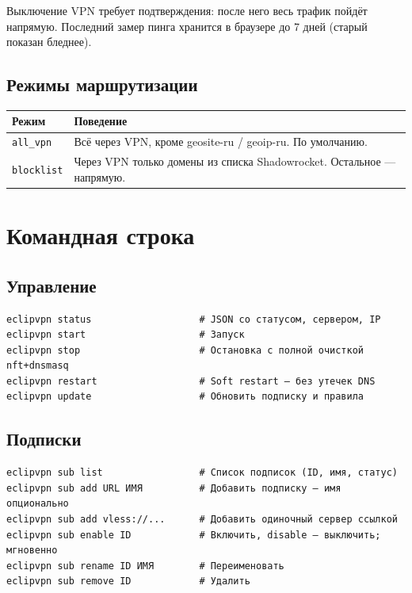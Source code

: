\documentclass[11pt,a4paper]{article}
\begin{document}
Выключение VPN требует подтверждения: после него весь трафик пойдёт напрямую. Последний замер пинга хранится в браузере до 7 дней (старый показан бледнее).

\subsection{Режимы маршрутизации}

\begin{tabularx}{\textwidth}{l X}
\toprule
\textbf{Режим} & \textbf{Поведение} \\
\midrule
\texttt{all\_vpn} & Всё через VPN, кроме geosite-ru / geoip-ru. По умолчанию. \\
\texttt{blocklist} & Через VPN только домены из списка Shadowrocket. Остальное — напрямую. \\
\bottomrule
\end{tabularx}

\section{Командная строка}

\subsection{Управление}

\begin{lstlisting}
eclipvpn status                   # JSON со статусом, сервером, IP
eclipvpn start                    # Запуск
eclipvpn stop                     # Остановка с полной очисткой nft+dnsmasq
eclipvpn restart                  # Soft restart — без утечек DNS
eclipvpn update                   # Обновить подписку и правила
\end{lstlisting}

\subsection{Подписки}

\begin{lstlisting}
eclipvpn sub list                 # Список подписок (ID, имя, статус)
eclipvpn sub add URL ИМЯ          # Добавить подписку — имя опционально
eclipvpn sub add vless://...      # Добавить одиночный сервер ссылкой
eclipvpn sub enable ID            # Включить, disable — выключить; мгновенно
eclipvpn sub rename ID ИМЯ        # Переименовать
eclipvpn sub remove ID            # Удалить
\end{lstlisting}
\end{document}
